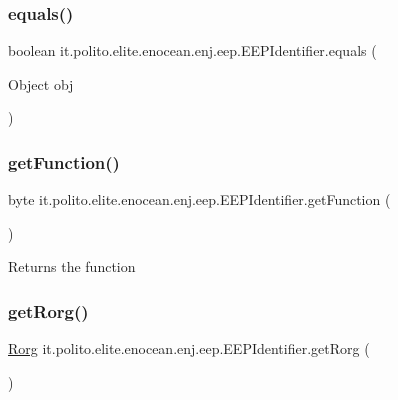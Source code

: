 \subsubsection{\texorpdfstring{equals()}{equals()}}
{\footnotesize\ttfamily boolean it.\+polito.\+elite.\+enocean.\+enj.\+eep.\+E\+E\+P\+Identifier.\+equals (\begin{DoxyParamCaption}\item[{Object}]{obj }\end{DoxyParamCaption})}

\hypertarget{classit_1_1polito_1_1elite_1_1enocean_1_1enj_1_1eep_1_1_e_e_p_identifier_aae8eb9ceaf4013ceed57c4e6d651387c}{}\label{classit_1_1polito_1_1elite_1_1enocean_1_1enj_1_1eep_1_1_e_e_p_identifier_aae8eb9ceaf4013ceed57c4e6d651387c} 
\subsubsection{\texorpdfstring{get\+Function()}{getFunction()}}
{\footnotesize\ttfamily byte it.\+polito.\+elite.\+enocean.\+enj.\+eep.\+E\+E\+P\+Identifier.\+get\+Function (\begin{DoxyParamCaption}{ }\end{DoxyParamCaption})}

\begin{DoxyReturn}{Returns}
the function 
\end{DoxyReturn}
\hypertarget{classit_1_1polito_1_1elite_1_1enocean_1_1enj_1_1eep_1_1_e_e_p_identifier_aee9d7138907c4bbbbd38e94f46eca7b9}{}\label{classit_1_1polito_1_1elite_1_1enocean_1_1enj_1_1eep_1_1_e_e_p_identifier_aee9d7138907c4bbbbd38e94f46eca7b9} 
\subsubsection{\texorpdfstring{get\+Rorg()}{getRorg()}}
{\footnotesize\ttfamily \hyperlink{classit_1_1polito_1_1elite_1_1enocean_1_1enj_1_1eep_1_1_rorg}{Rorg} it.\+polito.\+elite.\+enocean.\+enj.\+eep.\+E\+E\+P\+Identifier.\+get\+Rorg (\begin{DoxyParamCaption}{ }\end{DoxyParamCaption})}

